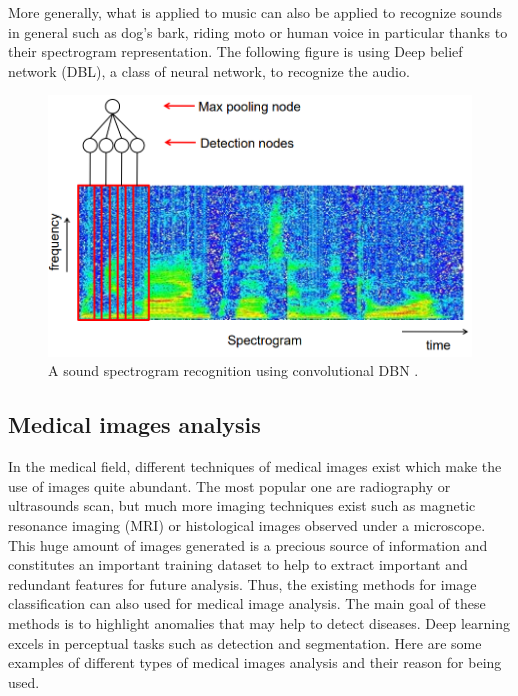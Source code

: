 \documentclass[11pt, openany]{report}
\theoremstyle{plain}
\theoremstyle{definition}
\theoremstyle{remark}
\begin{document}
More generally, what is applied to music can also be applied to recognize sounds in general such as dog's bark, riding moto or human voice in particular thanks to their spectrogram representation. The following figure is using Deep belief network (DBL), a class of neural network, to recognize the audio.

\begin{figure}[h]
  \centering
  \includegraphics[scale=0.4]{figures/spectrogramSound.png}
  \caption{A sound spectrogram recognition using convolutional DBN \cite{sound}.}
  \label{fig:spectrogramSound}
\end{figure}


\subsection{Medical images analysis}
In the medical field, different techniques of medical images exist which make the use of images quite abundant. The most popular one are radiography or ultrasounds scan, but much more imaging techniques exist such as magnetic resonance imaging (MRI) or histological images observed under a microscope. This huge amount of images generated is a precious source of information and constitutes an important training dataset to help to extract important and redundant features for future analysis. Thus, the existing methods for image classification can also used for medical image analysis. The main goal of these methods is to highlight anomalies that may help to detect diseases. Deep learning excels in perceptual tasks such as detection and segmentation. Here are some examples of different types of medical images analysis and their reason for being used.
\end{document}
